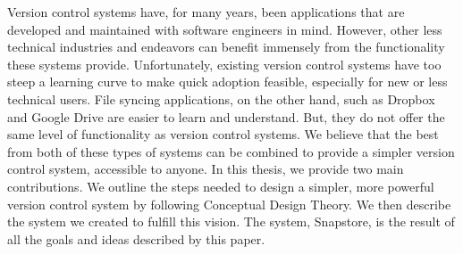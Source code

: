 % 
% 
%
Version control systems have, for many years, been applications that are developed and maintained with software engineers in mind. However, other less technical industries and endeavors can benefit immensely from the functionality these systems provide. Unfortunately, existing version control systems have too steep a learning curve to make quick adoption feasible, especially for new or less technical users. File syncing applications, on the other hand, such as Dropbox and Google Drive are easier to learn and understand. But, they do not offer the same level of functionality as version control systems. We believe that the best from both of these types of systems can be combined to provide a simpler version control system, accessible to anyone. In this thesis, we provide two main contributions. We outline the steps needed to design a simpler, more powerful version control system by following Conceptual Design Theory. We then describe the system we created to fulfill this vision. The system, Snapstore, is the result of all the goals and ideas described by this paper.
